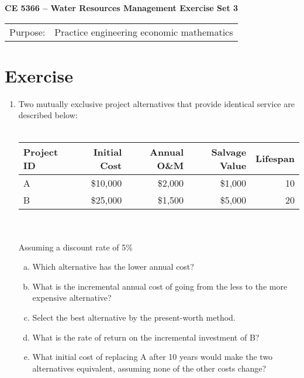 \documentclass[12pt]{article}
\begin{document}
\begin{center}
{\textbf{{ CE 5366 -- Water Resources Management}  {Exercise Set 3}}}
\end{center}
\begingroup
\begin{tabular}{p{1in} p{5in}}
Purpose: & Practice engineering economic mathematics \\
\end{tabular}
\endgroup
\section*{\small{Exercise}}
\begin{enumerate}
\item Two mutually exclusive project alternatives that provide identical service are described below: \\~\\
\begin{tabular}{lrrrr}
Project ID & Initial Cost & Annual O\&M & Salvage Value & Lifespan \\
\hline
\hline
A & \$10,000 & \$2,000 & \$1,000 & 10  \\
B & \$25,000 & \$1,500 & \$5,000 & 20  \\
\end{tabular}\\~\\
Assuming a discount rate of 5\% 
\begin{enumerate}[a)]
\item Which alternative has the lower annual cost?
\item What is the incremental annual cost of going from the less to the more expensive alternative?
\item Select the best alternative by the present-worth method.
\item What is the rate of return on the incremental investment of B?
\item What initial cost of replacing A after 10 years would make the two alternatives equivalent, assuming none of the other costs change?

\end{enumerate}
\end{enumerate}

\clearpage
\end{document}

